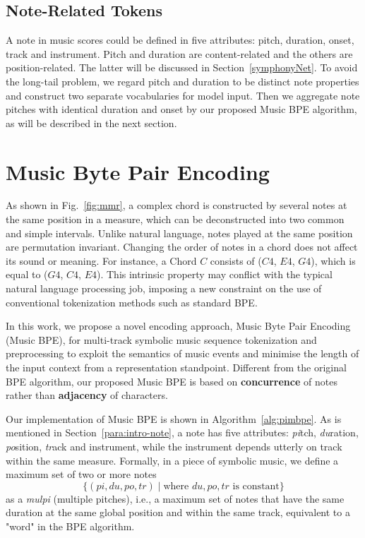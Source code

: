 \documentclass{article}
\begin{document}
\subsection{Note-Related Tokens}
A note in music scores could be defined in five attributes: pitch, duration, onset, track and instrument. Pitch and duration are content-related and the others are position-related. The latter will be discussed in Section~\ref{symphonyNet}. To avoid the long-tail problem, we regard pitch and duration to be distinct note properties and construct two separate vocabularies for model input. Then we aggregate note pitches with identical duration and onset by our proposed Music BPE algorithm, as will be described in the next section.

\section{Music Byte Pair Encoding} 
\label{Music BPE}
As shown in Fig.~\ref{fig:mmr}, a complex chord is constructed by several notes at the same position in a measure, which can be deconstructed into two common and simple intervals. Unlike natural language, notes played at the same position are permutation invariant. Changing the order of notes in a chord does not affect its sound or meaning. For instance, a Chord $C$ consists of ($C4$, $E4$, $G4$), which is equal to ($G4$, $C4$, $E4$). This intrinsic property may conflict with the typical natural language processing job, imposing a new constraint on the use of conventional tokenization methods such as standard BPE.

In this work, we propose a novel encoding approach, Music Byte Pair Encoding (Music BPE), for multi-track symbolic music sequence tokenization and preprocessing to exploit the semantics of music events and minimise the length of the input context from a representation standpoint. Different from the original BPE algorithm, our proposed Music BPE is based on \textbf{concurrence} of notes rather than \textbf{adjacency} of characters.

Our implementation of Music BPE is shown in Algorithm~\ref{alg:pimbpe}. As is mentioned in Section~\ref{para:intro-note}, a note has five attributes: \emph{pi}tch, \emph{du}ration, \emph{po}sition, \emph{tr}ack and instrument, while the instrument depends utterly on track within the same measure. Formally, in a piece of symbolic music, we define a maximum set of two or more notes 
\[ \{(pi, du, po, tr) \mid \text{where } du,po,tr \text{ is constant} \} \]
as a \emph{mulpi} (multiple pitches), i.e., a maximum set of notes that have the same duration at the same global position and within the same track, equivalent to a "word" in the BPE algorithm.
\end{document}
